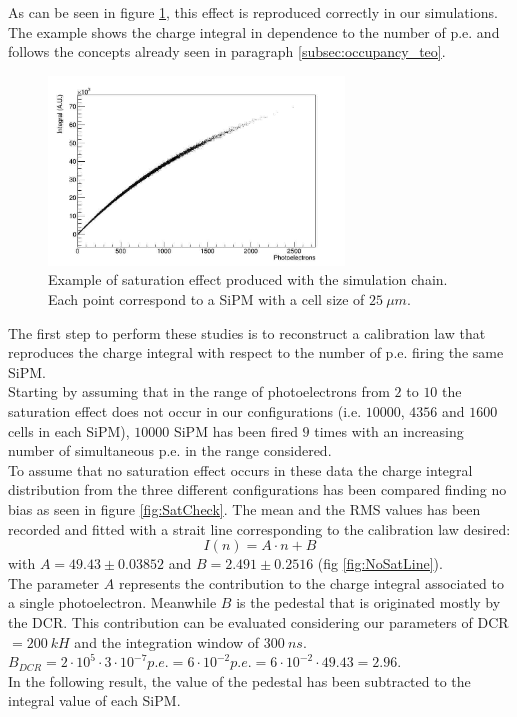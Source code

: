 As can be seen in figure \ref{fig:sat_example}, this effect is reproduced correctly in our simulations. The example shows the charge integral in dependence to the number of p.e. and follows the concepts already seen in paragraph \ref{subsec:occupancy_teo}.\\

\begin{figure}
	\centering
	\includegraphics[width=0.7\textwidth]{IMG/Cap5/SatExample.jpg}
	\caption{Example of saturation effect produced with the simulation chain. Each point correspond to a SiPM with a cell size of $25\ \mu m$.}
	\label{fig:sat_example}
\end{figure}

The first step to perform these studies is to reconstruct a calibration law that reproduces the charge integral with respect to the number of p.e. firing the same SiPM.\\
Starting by assuming that in the range of photoelectrons from $2$ to $10$ the saturation effect does not occur in our configurations (i.e. $10000$, $4356$ and $1600$ cells in each SiPM), $10000$ SiPM has been fired $9$ times with an increasing number of simultaneous p.e. in the range considered.\\
To assume that no saturation effect occurs in these data the charge integral distribution from the three different configurations has been compared finding no bias as seen in figure \ref{fig:SatCheck}. The mean and the RMS values has been recorded and fitted with a strait line corresponding to the calibration law desired:
\begin{equation}
	I(n) = A \cdot n + B
\end{equation}
with $A = 49.43 \pm 0.03852$ and $B = 2.491 \pm 0.2516$ (fig \ref{fig:NoSatLine}).\\
The parameter $A$ represents the contribution to the charge integral associated to a single photoelectron. Meanwhile $B$ is the pedestal that is originated mostly by the DCR. This contribution can be evaluated considering our parameters of DCR $= 200\ kH$ and the integration window of $300\ ns$.
$B_{DCR} = 2 \cdot 10^5 \cdot 3 \cdot 10^{-7} p.e. = 6\cdot 10^{-2} p.e. = 6\cdot 10^{-2} \cdot 49.43 = 2.96$.\\
In the following result, the value of the pedestal has been subtracted to the integral value of each SiPM.\\

